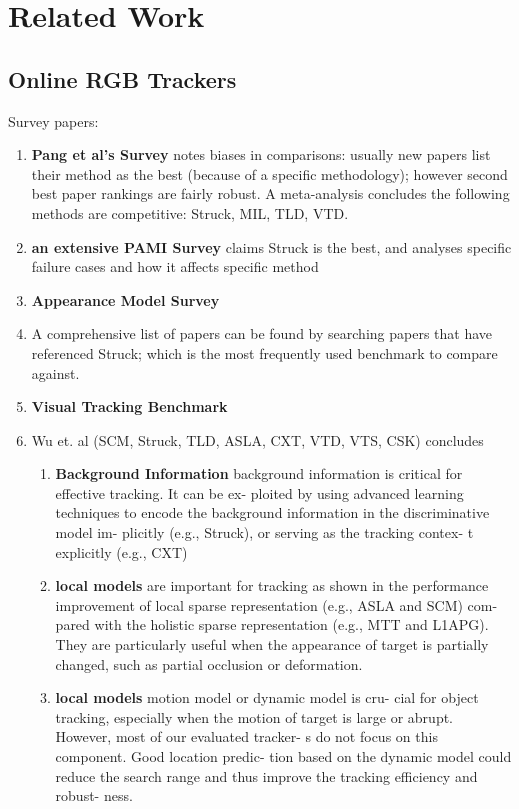 \chapter{Related Work}

\section{Online RGB Trackers}
Survey papers:
\begin{enumerate}
\item \textbf{Pang et al's Survey} \cite{pang2013finding} notes biases in comparisons: usually new papers list their method as the best (because of a specific methodology); however second best paper rankings are fairly robust. A meta-analysis concludes the following methods are competitive: Struck, MIL, TLD, VTD. 
\item \textbf{an extensive PAMI Survey} \cite{smeulders2013visual} claims Struck is the best, and analyses specific failure cases and how it affects specific method
\item \textbf{Appearance Model Survey} \cite{li2013survey}
\item A comprehensive list of papers can be found by searching papers that have referenced Struck; which is the most frequently used benchmark to compare against.
\item \textbf{Visual Tracking Benchmark}\cite{kristan2013visual} 
\item Wu et. al \cite{wu2013online} (SCM, Struck, TLD, ASLA, CXT, VTD, VTS, CSK)
concludes
    \begin{enumerate}
    \item \textbf{Background Information}  background
    information is critical for effective tracking. It can be ex-
    ploited by using advanced learning techniques to encode
    the background information in the discriminative model im-
    plicitly (e.g., Struck), or serving as the tracking contex-
    t explicitly (e.g., CXT)
    \item \textbf{local models}  are important for tracking as shown in the performance improvement
    of local sparse representation (e.g., ASLA and SCM) com-
    pared with the holistic sparse representation (e.g., MTT and
    L1APG). They are particularly useful when the appearance
    of target is partially changed, such as partial occlusion or
    deformation.
    \item \textbf{local models} motion model or dynamic model is cru-
    cial for object tracking, especially when the motion of target
    is large or abrupt. However, most of our evaluated tracker-
    s do not focus on this component. Good location predic-
    tion based on the dynamic model could reduce the search
    range and thus improve the tracking efficiency and robust-
    ness.
    \end{enumerate}
\end{enumerate}


